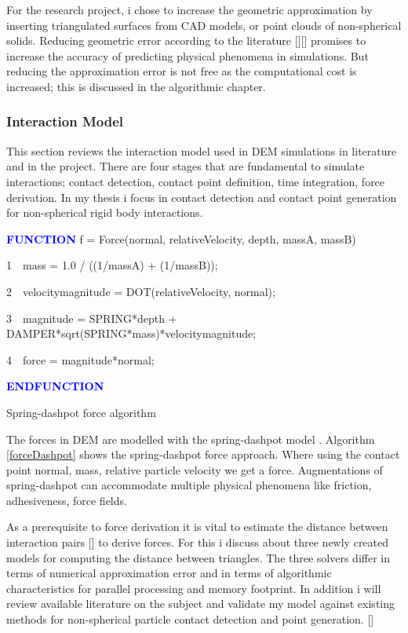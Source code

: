 \documentclass[times,12pt]{article}
\begin{document}
For the research project, i chose to increase the geometric approximation by inserting triangulated surfaces from CAD models, or point clouds of non-spherical solids. Reducing geometric error according to the literature [][] promises to increase the accuracy of predicting physical phenomena in simulations. But reducing the approximation error is not free as the computational cost is increased; this is discussed in the algorithmic chapter. 

\subsubsection{Interaction Model}

This section reviews the interaction model used in DEM simulations in literature and in the project. There are four stages that are fundamental to simulate interactions; contact detection, contact point definition, time integration, force derivation. In my thesis i focus in contact detection and contact point generation for non-spherical rigid body interactions.  

\begin{algorithm}	
  \textbf{\textcolor{blue}{FUNCTION}} f = Force(normal, relativeVelocity, depth, massA, massB)
  
  1~~mass = 1.0 / ((1/massA) + (1/massB));
  
  2~~velocitymagnitude = DOT(relativeVelocity, normal);
  
  3~~magnitude = SPRING*depth + DAMPER*sqrt(SPRING*mass)*velocitymagnitude;
  
  4~~force = magnitude*normal;
  
  \textbf{\textcolor{blue}{ENDFUNCTION}}
\protect\caption{\label{forceDashpot}Spring-dashpot force algorithm}
\end{algorithm}

The forces in DEM are modelled with the spring-dashpot model \cite{Koziara2008, solberg2000, Wachs2012, Williams1999}. Algorithm \ref{forceDashpot} shows the spring-dashpot force approach. Where using the contact point normal, mass, relative particle velocity we get a force. Augmentations of spring-dashpot can accommodate multiple physical phenomena like friction, adhesiveness, force fields. 

As a prerequisite to force derivation it is vital to estimate the distance between interaction pairs [] to derive forces. For this i discuss about three newly created models for computing the distance between triangles. The three solvers differ in terms of numerical approximation error and in terms of algorithmic characteristics for parallel processing and memory footprint. In addition i will review available literature on the subject and validate my model against existing methods for non-spherical particle contact detection and point generation. []  
\end{document}
